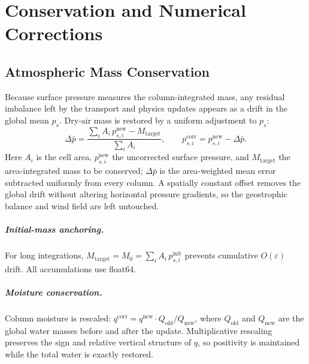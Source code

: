 \documentclass[11pt,twoside]{report}
\begin{document}
\chapter{Conservation and Numerical Corrections}
\label{ch:conservation}

\section{Atmospheric Mass Conservation}

Because surface pressure measures the column-integrated mass, any residual
imbalance left by the transport and physics updates appears as a drift in the
global mean $p_s$.  Dry-air mass is restored by a uniform adjustment to $p_s$:
\begin{equation}
  \Delta\bar p = \frac{\sum_i A_i\,p_{s,i}^{\mathrm{new}} - M_{\mathrm{target}}}
  {\sum_i A_i},
  \qquad
  p_{s,i}^{\mathrm{corr}} = p_{s,i}^{\mathrm{new}} - \Delta\bar p.
\end{equation}
Here $A_i$ is the cell area, $p_{s,i}^{\mathrm{new}}$ the uncorrected surface
pressure, and $M_{\mathrm{target}}$ the area-integrated mass to be conserved;
$\Delta\bar p$ is the area-weighted mean error subtracted uniformly from every
column.  A spatially constant offset removes the global drift without altering
horizontal pressure gradients, so the geostrophic balance and wind field are
left untouched.

\paragraph{Initial-mass anchoring.}
For long integrations, $M_{\mathrm{target}}=M_0=\sum_i A_i\,p_{s,i}^{\mathrm{init}}$
prevents cumulative $O(\varepsilon)$ drift.  All accumulations use float64.

\paragraph{Moisture conservation.}
Column moisture is rescaled:
$q^{\mathrm{corr}}=q^{\mathrm{new}}\cdot Q_{\mathrm{old}}/Q_{\mathrm{new}}$,
where $Q_{\mathrm{old}}$ and $Q_{\mathrm{new}}$ are the global water masses
before and after the update.  Multiplicative rescaling preserves the sign and
relative vertical structure of $q$, so positivity is maintained while the total
water is exactly restored.
\end{document}
